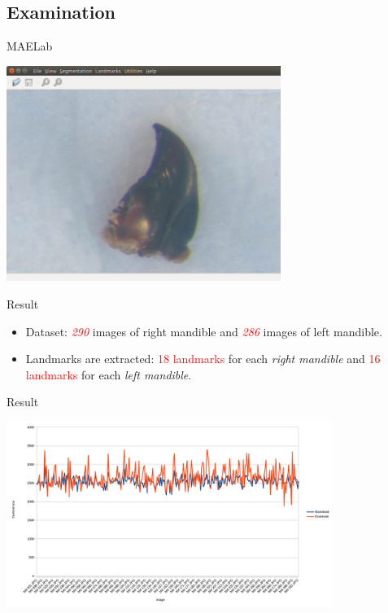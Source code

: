 \documentclass{beamer}
\begin{document}
\subsection{Examination}
\begin{frame}{MAELab}
	\begin{center}
		\includegraphics[height=7cm]{images/software}
	\end{center}
\end{frame}
\begin{frame}{Result}		
	\begin{itemize}
		\item Dataset: \textit{\textcolor{red}{290}} images of right mandible and \textit{\textcolor{red}{286}} images of left mandible.
		\item Landmarks are extracted: \textcolor{red}{18 landmarks} for each \textit{right mandible} and \textcolor{red}{16 landmarks} for each \textit{left mandible}.
	\end{itemize}
\end{frame}
\begin{frame}{Result}
	\begin{center}
		\includegraphics[height=6cm]{images/MdChart.png}	
	\end{center}
\end{frame}
\end{document}
